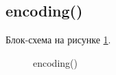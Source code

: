 \subsection{encoding()}

Блок-схема на рисунке \ref{fig:encoding}.

\begin{figure}[h]
    \caption{encoding()}
    \label{fig:encoding}
\end{figure}





\newpage